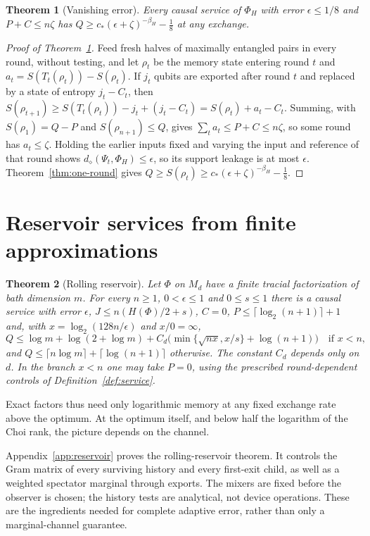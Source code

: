 \documentclass[11pt,a4paper]{article}
\theoremstyle{plain}
\newtheorem{theorem}{Theorem}[section]
\theoremstyle{definition}
\theoremstyle{remark}
\newcommand{\ddia}{d_\diamond}
\begin{document}
\begin{theorem}[Vanishing error]\label{thm:separation}
Every causal service of $\Phi_H$ with error $\epsilon\le1/8$ and $P+C\le n\zeta$ has $Q\ge c_*(\epsilon+\zeta)^{-\beta_H}-\tfrac18$ at any
exchange.
\end{theorem}


\begin{proof}[Proof of Theorem~\ref{thm:separation}]
Feed fresh halves of maximally entangled pairs in every round, without testing, and let $\rho_t$ be the memory state entering round $t$
and $a_t=S(T_t(\rho_t))-S(\rho_t)$. If $j_t$ qubits are exported after round $t$ and replaced by a state of entropy $j_t-C_t$, then
$S(\rho_{t+1})\ge S(T_t(\rho_t))-j_t+(j_t-C_t)=S(\rho_t)+a_t-C_t$. Summing, with $S(\rho_1)=Q-P$ and $S(\rho_{n+1})\le Q$, gives
$\sum_ta_t\le P+C\le n\zeta$, so some round has $a_t\le\zeta$. Holding the earlier inputs fixed and varying the input and reference of
that round shows $\ddia(\Psi_t,\Phi_H)\le\epsilon$, so its support leakage is at most $\epsilon$. Theorem~\ref{thm:one-round} gives
$Q\ge S(\rho_t)\ge c_*(\epsilon+\zeta)^{-\beta_H}-\frac18$.
\end{proof}


\section{Reservoir services from finite approximations}\label{sec:upper}


\begin{theorem}[Rolling reservoir]\label{thm:upper}
Let $\Phi$ on $M_d$ have a finite tracial factorization of bath dimension $m$. For every $n\ge1$, $0<\epsilon\le1$ and $0\le s\le1$
there is a causal service with error $\epsilon$, $J\le n(H(\Phi)/2+s)$, $C=0$, $P\le\lceil\log_2(n+1)\rceil+1$ and, with
$x=\log_2(128n/\epsilon)$ and $x/0=\infty$,
\[
Q\le\log m+\log(2+\log m)+C_d\big(\min\{\sqrt{nx},x/s\}+\log(n+1)\big)\quad\text{if }x<n,
\]
and $Q\le\lceil n\log m\rceil+\lceil\log(n+1)\rceil$ otherwise. The constant $C_d$ depends only on $d$.
In the branch $x<n$ one may take $P=0$, using the prescribed round-dependent controls of Definition~\ref{def:service}.
\end{theorem}

Exact factors thus need only logarithmic memory at any fixed exchange rate above the optimum. At the optimum itself, and below half the
logarithm of the Choi rank, the picture depends on the channel.


Appendix~\ref{app:reservoir} proves the rolling-reservoir theorem.
It controls the Gram matrix of every surviving history and every first-exit
child, as well as a weighted spectator marginal through exports. The mixers
are fixed before the observer is chosen; the history tests are analytical,
not device operations. These are the ingredients needed for complete adaptive
error, rather than only a marginal-channel guarantee.
\end{document}
